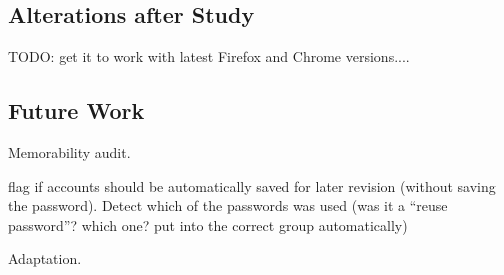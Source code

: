\subsection{Alterations after Study}
TODO: get it to work with latest Firefox and Chrome versions....

\subsection{Future Work}
Memorability audit.

flag if accounts should be automatically saved for later revision (without saving the password). Detect which of the passwords was used (was it a ``reuse password''? which one? put into the correct group automatically)

Adaptation. 




